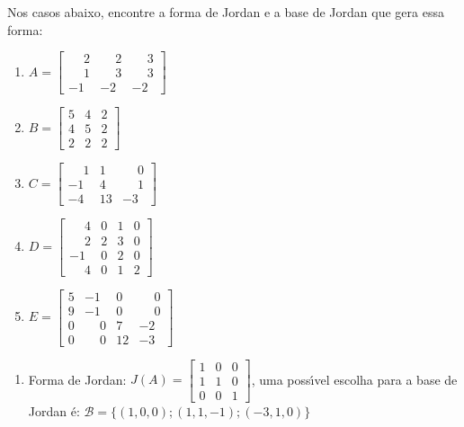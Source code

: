 \documentclass[12pt]{exam}
\begin{document}
\begin{exercicio}
  Nos casos abaixo, encontre a forma de Jordan e a base de Jordan que gera essa forma:
  \begin{enumerate}[label=({\alph*})]
    \item $A = \begin{bmatrix}
      \phantom{-} 2 & \phantom{-} 2 & \phantom{-} 3\\
      \phantom{-} 1 & \phantom{-} 3 & \phantom{-} 3\\
      -1 & -2 & -2
    \end{bmatrix}$
    \item $B = \begin{bmatrix}
      5 & 4 & 2\\
      4 & 5 & 2\\
      2 & 2 & 2
    \end{bmatrix}$
    \item $C = \begin{bmatrix}
      \phantom{-} 1 & 1 & \phantom{-} 0\\
      -1 & 4 & \phantom{-} 1\\
      -4 & 13 & -3
    \end{bmatrix}$
    \item $D = \begin{bmatrix}
      \phantom{-} 4 & 0 & 1 & 0\\
      \phantom{-} 2 & 2 & 3 & 0\\
      -1 & 0 & 2 & 0\\
      \phantom{-} 4 & 0 & 1 & 2
    \end{bmatrix}$
    \item $E = \begin{bmatrix}
      5 & -1 & 0 & \phantom{-} 0\\
      9 & -1 & 0 & \phantom{-} 0\\
      0 & \phantom{-} 0 & 7 & -2\\
      0 & \phantom{-} 0 & 12 & -3
    \end{bmatrix}$
  \end{enumerate}
  \begin{solucao}
    \begin{enumerate}[label=({\alph*})]
      \item Forma de Jordan: $J(A) = \begin{bmatrix}
        1 & 0 & 0\\
        1 & 1 & 0\\
        0 & 0 & 1
      \end{bmatrix}$, uma poss{\'\i}vel escolha para a base de Jordan \'e: $\mathcal{B} = \{(1,0,0);(1,1,-1);(-3,1,0)\}$

\end{enumerate}
\end{solucao}
\end{exercicio}
\end{document}
